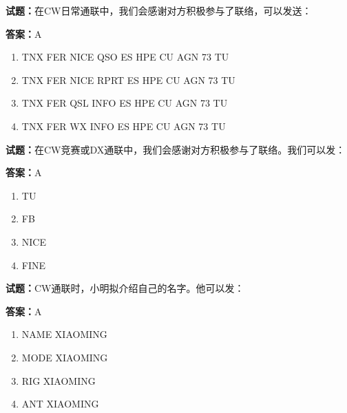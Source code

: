 \documentclass{ctexbook}
\begin{document}




\vspace{1em}

\textbf{试题：}在CW日常通联中，我们会感谢对方积极参与了联络，可以发送： 

\textbf{答案：}A 

\begin{enumerate}[leftmargin=3em]
  \item TNX FER NICE QSO ES HPE CU AGN 73 TU 

  \item TNX FER NICE RPRT ES HPE CU AGN 73 TU 

  \item TNX FER QSL INFO ES HPE CU AGN 73 TU 

  \item TNX FER WX INFO ES HPE CU AGN 73 TU 

\end{enumerate}





\vspace{1em}

\textbf{试题：}在CW竞赛或DX通联中，我们会感谢对方积极参与了联络。我们可以发： 

\textbf{答案：}A 

\begin{enumerate}[leftmargin=3em]
  \item TU 

  \item FB 

  \item NICE 

  \item FINE 

\end{enumerate}






\vspace{1em}

\textbf{试题：}CW通联时，小明拟介绍自己的名字。他可以发： 

\textbf{答案：}A 

\begin{enumerate}[leftmargin=3em]
  \item NAME XIAOMING 

  \item MODE XIAOMING 

  \item RIG XIAOMING 

  \item ANT XIAOMING 

\end{enumerate}
\end{document}
